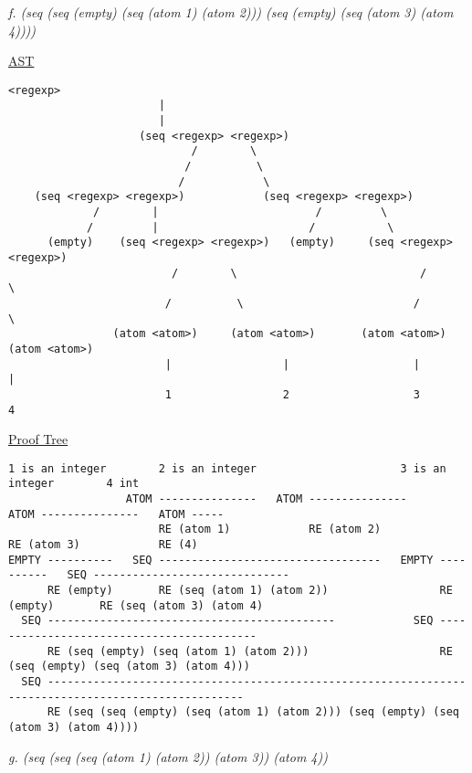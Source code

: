 \documentclass{article}
\begin{document}
\begin{quoting}
\textit{f. (seq (seq (empty) (seq (atom 1) (atom 2))) (seq (empty) (seq (atom 3) (atom 4))))}
\end{quoting}

\underline{AST}
\begin{lstlisting}[language=vasu]
                    <regexp>
                       |
                       |
                    (seq <regexp> <regexp>)
                            /        \
                           /          \
                          /            \
    (seq <regexp> <regexp>)            (seq <regexp> <regexp>)
             /        |                        /         \
            /         |                       /           \
      (empty)    (seq <regexp> <regexp>)   (empty)     (seq <regexp> <regexp>)
                         /        \                            /        \
                        /          \                          /          \
                (atom <atom>)     (atom <atom>)       (atom <atom>)     (atom <atom>)
                        |                 |                   |                 |
                        1                 2                   3                 4

\end{lstlisting}

\underline{Proof Tree}
\begin{lstlisting}[language=vasuB]
                       1 is an integer        2 is an integer                      3 is an integer        4 int
                  ATOM ---------------   ATOM ---------------                 ATOM ---------------   ATOM -----
                       RE (atom 1)            RE (atom 2)                          RE (atom 3)            RE (4)
EMPTY ----------   SEQ ----------------------------------   EMPTY ----------   SEQ ------------------------------
      RE (empty)       RE (seq (atom 1) (atom 2))                 RE (empty)       RE (seq (atom 3) (atom 4)   
  SEQ --------------------------------------------            SEQ ------------------------------------------  
      RE (seq (empty) (seq (atom 1) (atom 2)))                    RE (seq (empty) (seq (atom 3) (atom 4)))
  SEQ ----------------------------------------------------------------------------------------------------       
      RE (seq (seq (empty) (seq (atom 1) (atom 2))) (seq (empty) (seq (atom 3) (atom 4))))
\end{lstlisting}


\begin{quoting}
\textit{g. (seq (seq (seq (atom 1) (atom 2)) (atom 3)) (atom 4))}
\end{quoting}
\end{document}

